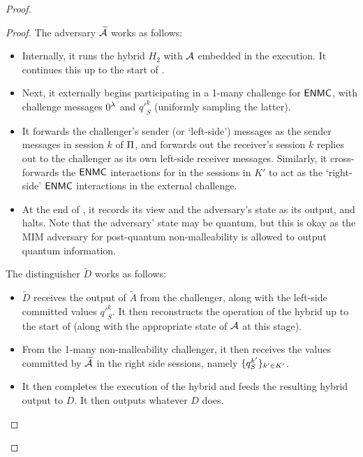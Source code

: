 \begin{proof}
\begin{proof}
        The adversary $\widetilde{\mathcal{A}}$ works as follows: 
        \begin{itemize}
            \item Internally, it runs the hybrid $H_2$ with $\mathcal{A}$ embedded in the execution. It continues this up to the start of . 
            \item Next, it externally begins participating in a 1-many challenge for $\mathsf{ENMC}$, with challenge messages $0^\lambda$ and ${q'}_S^k$ (uniformly sampling the latter). 
            \item It forwards the challenger's sender (or `left-side') messages as the  sender messages in session $k$ of $\mathrm{\Pi}$, and forwards out the receiver's session $k$ replies out to the challenger as its own left-side receiver messages. Similarly, it cross-forwards the $\mathsf{ENMC}$ interactions for  in the sessions in $K'$ to act as the `right-side' $\mathsf{ENMC}$ interactions in the external challenge. 
            \item At the end of , it records its view and the adversary's state as its output, and halts. Note that the adversary' state may be quantum, but this is okay as the MIM adversary for post-quantum non-malleability is allowed to output quantum information. 
        \end{itemize}

        The distinguisher $\tilde{D}$ works as follows: 
        \begin{itemize}
            \item $\tilde{D}$ receives the output of $\tilde{A}$ from the challenger, along with the left-side committed values ${q'}_S^k$. It then reconstructs the operation of the hybrid up to the start of  (along with the appropriate state of $\mathcal{A}$ at this stage).  
            \item From the 1-many non-malleability challenger, it then receives the values committed by $\widetilde{\mathcal{A}}$ in the right side sessions, namely $\{q_S^{k'}\}_{k' \in K'}$. 
            \item It then completes the execution of the hybrid and feeds the resulting hybrid output to $D$. It then outputs whatever $D$ does. 
        \end{itemize}


\end{proof}
\end{proof}
